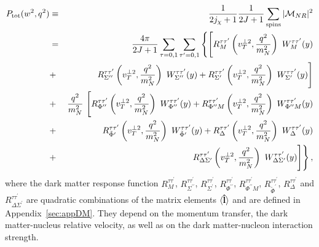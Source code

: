 \documentclass[11pt,a4paper]{article}
\begin{document}
\begin{eqnarray}
P_{\rm tot}({w}^2,{q}^2)&\equiv&{1 \over 2j_\chi + 1} {1 \over 2J + 1} \sum_{\rm spins} |\mathcal{M}_{NR}|^2 \nonumber \\  &=& {4 \pi \over 2J + 1} 
\sum_{ \tau=0,1} \sum_{\tau^\prime = 0,1} \Bigg\{ \Bigg[ R_{M}^{\tau \tau^\prime}\left({v}^{\perp 2}_{T}, {{q}^{2} \over m_N^2}\right)~W_{M}^{\tau \tau^\prime}(y)   \nonumber\\
&+& R_{\Sigma^{\prime \prime}}^{\tau \tau^\prime}\left({v}^{\perp 2}_{T}, {{q}^{2} \over m_N^2}\right)   ~W_{\Sigma^{\prime \prime}}^{\tau \tau^\prime}(y) 
+   R_{\Sigma^\prime}^{\tau \tau^\prime}\left({v}^{\perp 2}_{T}, {{q}^{2} \over m_N^2}\right) ~ W_{\Sigma^\prime}^{\tau \tau^\prime}(y) \Bigg]  \nonumber\\  
&+& {{q}^{2} \over m_N^2} ~\Bigg[R_{\Phi^{\prime \prime}}^{\tau \tau^\prime}\left({v}^{\perp 2}_{T}, {{q}^{2} \over m_N^2}\right) ~ W_{\Phi^{\prime \prime}}^{\tau \tau^\prime}(y)  +  R_{ \Phi^{\prime \prime}M}^{\tau \tau^\prime}\left({v}^{\perp 2}_{T}, {{q}^{2} \over m_N^2}\right)  ~W_{ \Phi^{\prime \prime}M}^{\tau \tau^\prime}(y) \nonumber\\
&+&   R_{\tilde{\Phi}^\prime}^{\tau \tau^\prime}\left({v}^{\perp 2}_{T}, {{q}^{2} \over m_N^2}\right) ~W_{\tilde{\Phi}^\prime}^{\tau \tau^\prime}(y) 
+   R_{\Delta}^{\tau \tau^\prime}\left({v}^{\perp 2}_{T}, {{q}^{2} \over m_N^2}\right) ~ W_{\Delta}^{\tau \tau^\prime}(y) \nonumber\\
 &+&  R_{\Delta \Sigma^\prime}^{\tau \tau^\prime}\left({v}^{\perp 2}_{T}, {{q}^{2} \over m_N^2}\right)  ~W_{\Delta \Sigma^\prime}^{\tau \tau^\prime}(y)   \Bigg]  \Bigg\}  \,,
\label{eq:Ptot}
\end{eqnarray}
where the dark matter response function $R_{M}^{\tau \tau^\prime}$, $R_{\Sigma^{\prime \prime}}^{\tau \tau^\prime}$, $R_{\Sigma^\prime}^{\tau \tau^\prime}$, $R_{\Phi^{\prime \prime}}^{\tau \tau^\prime}$, $R_{\Phi^{\prime\prime}M}^{\tau \tau^\prime}$, $R_{\tilde{\Phi}^\prime}^{\tau \tau^\prime}$, $R_{\Delta}^{\tau \tau^\prime}$ and $R_{\Delta \Sigma^\prime}^{\tau \tau^\prime}$ are quadratic combinations of the matrix elements $\langle {\bf{\hat{l}}} \rangle$ and are defined in Appendix~\ref{sec:appDM}. They depend on the momentum transfer, the dark matter-nucleus relative velocity, as well as on the dark matter-nucleon interaction strength. 
\end{document}
